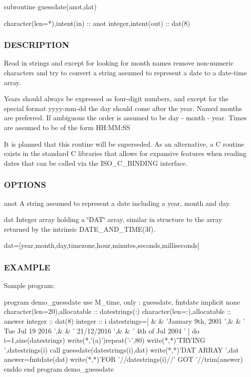 \begin{DoxyVerb}
\begin{DoxyVerb}subroutine guessdate(anot,dat)

 character(len=*),intent(in) :: anot
 integer,intent(out)         :: dat(8)
\end{DoxyVerb}


\subsubsection*{D\+E\+S\+C\+R\+I\+P\+T\+I\+ON}

\begin{DoxyVerb}Read in strings and except for looking for month names remove
non-numeric characters and try to convert a string assumed to represent
a date to a date-time array.

Years should always be expressed as four-digit numbers, and except for
the special format yyyy-mm-dd the day should come after the year. Named
months are preferred. If ambiguous the order is assumed to be day -
month - year. Times are assumed to be of the form HH:MM:SS

It is planned that this routine will be superseded. As an alternative,
a C routine exists in the standard C libraries that allows for
expansive features when reading dates that can be called via the
ISO_C_BINDING interface.
\end{DoxyVerb}


\subsubsection*{O\+P\+T\+I\+O\+NS}

anot A string assumed to represent a date including a year, month and day.

dat Integer array holding a \char`\"{}\+D\+A\+T\char`\"{} array, similar in structure to the array returned by the intrinsic D\+A\+T\+E\+\_\+\+A\+N\+D\+\_\+\+T\+I\+M\+E(3f).

dat=\mbox{[}year,month,day,timezone,hour,minutes,seconds,milliseconds\mbox{]}

\subsubsection*{E\+X\+A\+M\+P\+LE}

\begin{DoxyVerb}Sample program:

 program demo_guessdate
 use M_time, only : guessdate, fmtdate
 implicit none
 character(len=20),allocatable :: datestrings(:)
 character(len=:),allocatable  :: answer
 integer                       :: dat(8)
 integer                       :: i
    datestrings=[ &
    & 'January 9th, 2001   ',&
    & ' Tue Jul 19 2016    ',&
    & ' 21/12/2016         ',&
    & ' 4th of Jul 2004    ' ]
    do i=1,size(datestrings)
       write(*,'(a)')repeat('-',80)
       write(*,*)'TRYING ',datestrings(i)
       call guessdate(datestrings(i),dat)
       write(*,*)'DAT ARRAY ',dat
       answer=fmtdate(dat)
       write(*,*)'FOR '//datestrings(i)//' GOT '//trim(answer)
    enddo
 end program demo_guessdate


\end{DoxyVerb}
\end{DoxyVerb}
